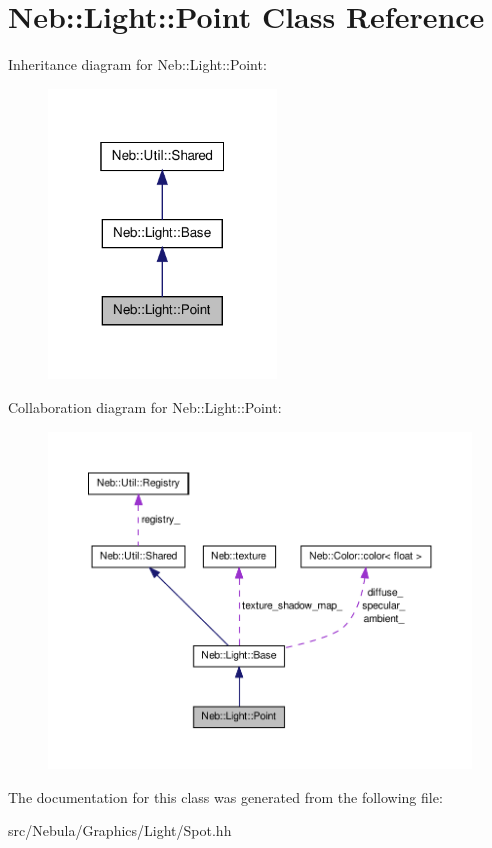 \hypertarget{classNeb_1_1Light_1_1Point}{\section{\-Neb\-:\-:\-Light\-:\-:\-Point \-Class \-Reference}
\label{classNeb_1_1Light_1_1Point}
}


\-Inheritance diagram for \-Neb\-:\-:\-Light\-:\-:\-Point\-:\nopagebreak
\begin{figure}[H]
\begin{center}
\leavevmode
\includegraphics[width=172pt]{classNeb_1_1Light_1_1Point__inherit__graph}
\end{center}
\end{figure}


\-Collaboration diagram for \-Neb\-:\-:\-Light\-:\-:\-Point\-:\nopagebreak
\begin{figure}[H]
\begin{center}
\leavevmode
\includegraphics[width=350pt]{classNeb_1_1Light_1_1Point__coll__graph}
\end{center}
\end{figure}


\-The documentation for this class was generated from the following file\-:\begin{DoxyCompactItemize}
\item 
src/\-Nebula/\-Graphics/\-Light/\-Spot.\-hh\end{DoxyCompactItemize}
